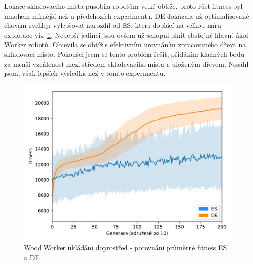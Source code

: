    	Lokace skladovacího místa působila robotům velké obtíže, proto růst fitness byl mnohem mírnější než u předchozích experimentů. DE dokázala už optimalizované chování rychleji vylepšovat narozdíl od ES, která doplácí na velkou míru explorace viz. \ref{obr04:StockESvsDE}. Nejlepší jedinci jsou ovšem už schopni plnit obstojně hlavní úkol Worker robotů. Objevila se obtíž s efektivním urovnáním zpracovaného dřeva na skladovací místo. Pokoušel jsem se tento problém řešit, přidáním kladných bodů za menší vzdálenost mezi středem skladovacího místa a uloženým dřevem. Nesáhl jsem, však lepších výsledků než v tomto experimentu. 
	\begin{figure}[t]\centering
		\includegraphics[width=\columnwidth]{../img/WoodMap/DEvsES/WorkerStockMem}
		\caption{Wood Worker ukládání doprostřed  - porovnání průměrné fitness ES a DE}
		\label{obr04:StockESvsDE}
	\end{figure}


	\clearpage
